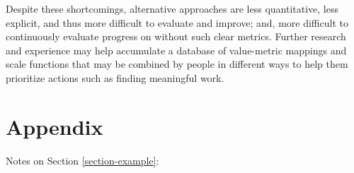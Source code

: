 \documentclass[10pt, a4paper, twocolumn]{IEEEconf}
\begin{document}
Despite these shortcomings, alternative approaches are less quantitative, less explicit, and thus more difficult to evaluate and improve; and, more difficult to continuously evaluate progress on without such clear metrics. Further research and experience may help accumulate a database of value-metric mappings and scale functions that may be combined by people in different ways to help them prioritize actions such as finding meaningful work.




\newpage
\clearpage

\section{Appendix}

Notes on Section \ref{section-example}:
\end{document}
